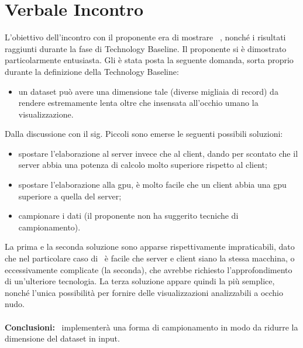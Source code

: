 \section{Verbale Incontro}
L'obiettivo dell'incontro con il proponente era di mostrare \hd\ , nonché i risultati raggiunti durante la fase di Technology Baseline. Il proponente si è dimostrato particolarmente entusiasta. Gli è stata posta la seguente domanda, sorta proprio durante la definizione della Technology Baseline:
\begin{itemize}
    \item un dataset può avere una dimensione tale (diverse migliaia di record) da rendere estremamente lenta oltre che insensata all'occhio umano la visualizzazione.
\end{itemize}

Dalla discussione con il sig. Piccoli sono emerse le seguenti possibili soluzioni:
\begin{itemize}
    \item spostare l'elaborazione al server invece che al client, dando per scontato che il server abbia una potenza di calcolo molto superiore rispetto al client;
    \item spostare l'elaborazione alla gpu, è molto facile che un client abbia una gpu superiore a quella del server;
    \item campionare i dati (il proponente non ha suggerito tecniche di campionamento).
\end{itemize}
La prima e la seconda soluzione sono apparse rispettivamente impraticabili, dato che nel particolare caso di \hd\ è facile che server e client siano la stessa macchina, o eccessivamente complicate (la seconda), che avrebbe richiesto l'approfondimento di un'ulteriore tecnologia. La terza soluzione appare quindi la più semplice, nonché l'unica possibilità per fornire delle visualizzazioni analizzabili a occhio nudo.
\\ \\ 
\noindent \textbf{Conclusioni:}
\cod\ implementerà una forma di campionamento in modo da ridurre la dimensione del dataset in input.